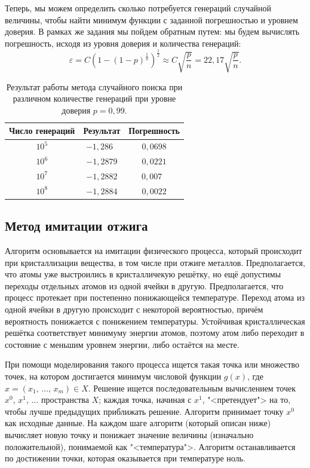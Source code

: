Теперь, мы можем определить сколько потребуется генераций случайной величины, чтобы найти минимум функции с заданной погрешностью и уровнем доверия. В рамках же задания мы пойдем обратным путем: мы будем вычислять погрешность, исходя из уровня доверия и количества генераций:
$$
        \varepsilon
=
        C\left( 1 - (1 - p)^{\frac{1}{n}} \right)^{\frac12}
\approx
        C\sqrt{\frac{p}{n}}
=
22,\!17\sqrt{\frac{p}{n}}.
$$

\begin{table}[h]
\begin{center}
\begin{tabular}{|c|c|c|}
\hline
Число генераций &
Результат  &
Погрешность
\\
\hline
$10^5$
&
$-1,\!286\;\;$
&
$0,\!0698$
\\
\hline
$10^6$
&
$-1,\!2879$
&
$0,\!0221$
\\
\hline
$10^7$
&
$-1,\!2882$
&
$0,\!007\;\;$
\\
\hline
$10^8$
&
$-1,\!2884$
&
$0,\!0022$
\\
\hline
\end{tabular}
\end{center}
\caption{Результат работы метода случайного поиска при различном количестве генераций при уровне доверия $p = 0,\!99$.}
\end{table}


\subsection{Метод имитации отжига}

Алгоритм основывается на имитации физического процесса, который происходит при кристаллизации вещества, в том числе при отжиге металлов. Предполагается, что атомы уже выстроились в кристалличекую решётку, но ещё допустимы переходы отдельных атомов из одной ячейки в другую. Предполагается, что процесс протекает при постепенно понижающейся температуре. Переход атома из одной ячейки в другую происходит с некоторой вероятностью, причём вероятность понижается с понижением температуры. Устойчивая кристаллическая решётка соответствует минимуму энергии атомов, поэтому атом либо переходит в состояние с меньшим уровнем энергии, либо остаётся на месте.

При помощи моделирования такого процесса ищется такая точка или множество точек, на котором достигается минимум числовой функции $g(x)$, где $x=(x_1,\,\ldots,\,x_m) \in X$. Решение ищется последовательным вычислением точек $x^0,\,x^1,\,\ldots$ пространства $X$; каждая точка, начиная с $x^1$, "<претендует"> на то, чтобы лучше предыдущих приближать решение. Алгоритм принимает точку $x^0$ как исходные данные. На каждом шаге алгоритм (который описан ниже) вычисляет новую точку и понижает значение величины (изначально положительной), понимаемой как "<температура">. Алгоритм останавливается по достижении точки, которая оказывается при температуре ноль.

